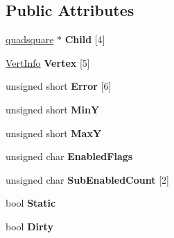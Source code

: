 \subsection*{Public Attributes}
\begin{DoxyCompactItemize}
\item 
\hyperlink{classquadsquare}{quadsquare} $\ast$ {\bfseries Child} \mbox{[}4\mbox{]}\hypertarget{classquadsquare_a8e9f96b14da5c426b5d82430afcaaedb}{}\label{classquadsquare_a8e9f96b14da5c426b5d82430afcaaedb}

\item 
\hyperlink{structVertInfo}{Vert\+Info} {\bfseries Vertex} \mbox{[}5\mbox{]}\hypertarget{classquadsquare_aecba585af64a61a783c1706841022c03}{}\label{classquadsquare_aecba585af64a61a783c1706841022c03}

\item 
unsigned short {\bfseries Error} \mbox{[}6\mbox{]}\hypertarget{classquadsquare_a1bed113f30118602cb1c5c13481a5394}{}\label{classquadsquare_a1bed113f30118602cb1c5c13481a5394}

\item 
unsigned short {\bfseries MinY}\hypertarget{classquadsquare_a1ae1cacb91e1fdb92a17302e8eda435b}{}\label{classquadsquare_a1ae1cacb91e1fdb92a17302e8eda435b}

\item 
unsigned short {\bfseries MaxY}\hypertarget{classquadsquare_a60ea8adb198e8f436a0e8ce525ceafef}{}\label{classquadsquare_a60ea8adb198e8f436a0e8ce525ceafef}

\item 
unsigned char {\bfseries Enabled\+Flags}\hypertarget{classquadsquare_adcbef2612298f66a58e8404e7e3c1582}{}\label{classquadsquare_adcbef2612298f66a58e8404e7e3c1582}

\item 
unsigned char {\bfseries Sub\+Enabled\+Count} \mbox{[}2\mbox{]}\hypertarget{classquadsquare_ae2cfacf6df6226fbd5bc9d9fc4a93660}{}\label{classquadsquare_ae2cfacf6df6226fbd5bc9d9fc4a93660}

\item 
bool {\bfseries Static}\hypertarget{classquadsquare_abb0bc934bacc84e852952ff55a8a1beb}{}\label{classquadsquare_abb0bc934bacc84e852952ff55a8a1beb}

\item 
bool {\bfseries Dirty}\hypertarget{classquadsquare_a50eb46cac8309a57867b8badb632410b}{}\label{classquadsquare_a50eb46cac8309a57867b8badb632410b}

\end{DoxyCompactItemize}


